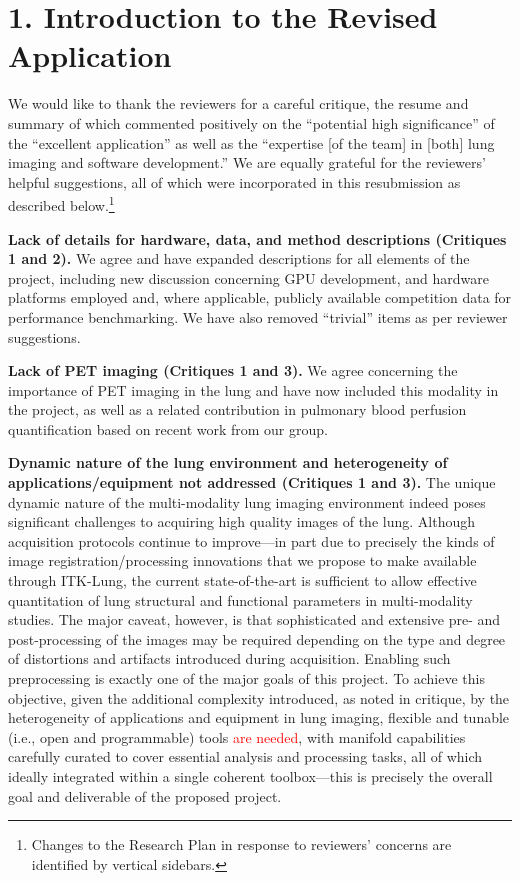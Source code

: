\documentclass[11pt,]{article}
\title{}
\author{}
\date{}
\let\rmarkdownfootnote\footnote%
\def\footnote{\protect\rmarkdownfootnote}
\begin{document}
\maketitle


\section{1. Introduction to the Revised
Application}\label{introduction-to-the-revised-application}

We would like to thank the reviewers for a careful critique, the resume
and summary of which commented positively on the ``potential high
significance'' of the ``excellent application'' as well as the
``expertise {[}of the team{]} in {[}both{]} lung imaging and software
development.'' We are equally grateful for the reviewers' helpful
suggestions, all of which were incorporated in this resubmission as
described below.\footnote{Changes to the Research Plan in response to
  reviewers' concerns are identified by vertical sidebars.}

\textbf{Lack of details for hardware, data, and method descriptions
(Critiques 1 and 2). } We agree and have expanded descriptions for all
elements of the project, including new discussion concerning GPU
development, and hardware platforms employed and, where applicable,
publicly available competition data for performance benchmarking. We
have also removed ``trivial'' items as per reviewer suggestions.

\textbf{Lack of PET imaging (Critiques 1 and 3).} We agree concerning
the importance of PET imaging in the lung and have now included this
modality in the project, as well as a related contribution in pulmonary
blood perfusion quantification based on recent work from our group.

\textbf{Dynamic nature of the lung environment and heterogeneity of
applications/equipment not addressed (Critiques 1 and 3).} The unique
dynamic nature of the multi-modality lung imaging environment indeed
poses significant challenges to acquiring high quality images of the
lung. Although acquisition protocols continue to improve---in part due
to precisely the kinds of image registration/processing innovations that
we propose to make available through ITK-Lung, the current
state-of-the-art is sufficient to allow effective quantitation of lung
structural and functional parameters in multi-modality studies. The
major caveat, however, is that sophisticated and extensive pre- and
post-processing of the images may be required depending on the type and
degree of distortions and artifacts introduced during acquisition.
Enabling such preprocessing is exactly one of the major goals of this
project. To achieve this objective, given the additional complexity
introduced, as noted in critique, by the heterogeneity of applications
and equipment in lung imaging, flexible and tunable (i.e., open and
programmable) tools \textcolor{red}{are needed}, with manifold
capabilities carefully curated to cover essential analysis and
processing tasks, all of which ideally integrated within a single
coherent toolbox---this is precisely the overall goal and deliverable of
the proposed project.
\end{document}
